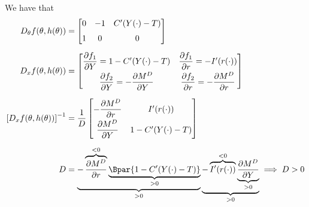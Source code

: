 \documentclass{article}
\begin{document}
We have that
\begin{align*}
  D_\theta f(\theta, h(\theta))
  & =
  \left[\begin{matrix}
      0
    & -1
    & C^\prime(Y(\cdot) - T) \\[6pt]
      1
    & 0
    & 0
  \end{matrix}\right] \\[6pt]
  D_x f(\theta, h(\theta))
  & =
  \left[\begin{matrix}
      \dfrac{\partial f_1}{\partial Y} = 1 - C^\prime(Y(\cdot) - T)
    & \dfrac{\partial f_1}{\partial r} = -I^\prime(r(\cdot)) \\[6pt]
      \dfrac{\partial f_2}{\partial Y} = -\dfrac{\partial M^D}{\partial Y}
    & \dfrac{\partial f_2}{\partial r} = -\dfrac{\partial M^D}{\partial r}
  \end{matrix}\right] \\[6pt]
  \left[D_x f(\theta, h(\theta))\right]^{-1}
  & =
  \dfrac{1}{D}
  \left[\begin{matrix}
      - \dfrac{\partial M^D}{\partial r}
    & I^\prime(r(\cdot)) \\[6pt]
      \dfrac{\partial M^D}{\partial Y}
    & 1 - C^\prime(Y(\cdot) - T)
  \end{matrix}\right] \\[6pt]
  D & =
  \underbrace{
   - \overbrace{\dfrac{\partial M^D}{\partial r}}^{< 0}
     \underbrace{\Bpar{1 - C^\prime(Y(\cdot) - T)}}_{> 0}
   }_{> 0}
  \underbrace{
   - \overbrace{I^\prime(r(\cdot))}^{< 0}
     \underbrace{\dfrac{\partial M^D}{\partial Y}}_{> 0}
   }_{> 0}
   \implies D > 0
\end{align*}
\end{document}

